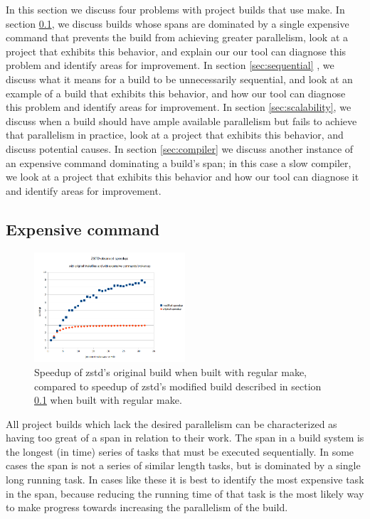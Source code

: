 \documentclass[sigconf,10pt,authorversion]{acmart}\settopmatter{printfolios=true,printccs=false,printacmref=false}
\begin{document}
In this section we discuss four problems with project builds that use make.  In section \ref{sec:expensive},
we discuss
builds whose spans are dominated by a single expensive command that prevents the build from
achieving greater parallelism, look at a project that exhibits this behavior, and explain our
our tool can diagnose this problem and identify areas for improvement.  In section \ref{sec:sequential}
, we discuss what
it means for a build to be unnecessarily sequential, and look at an example of a build that
exhibits this behavior, and how our tool can diagnose this problem and identify areas for improvement.
In section \ref{sec:scalability}, we discuss when a build should have ample available parallelism
but fails to achieve that
parallelism in practice, look at a project that exhibits this behavior, and discuss potential causes.
In section \ref{sec:compiler} we discuss another instance of an expensive command dominating a
build's span; in this case a
slow compiler, we look at a project that exhibits this behavior and how our tool can diagnose it
and identify areas for improvement.

\subsection{Expensive command}
\label{sec:expensive}

\begin{figure}[t]
  \includegraphics[width=0.5\textwidth]{zstd-speedup}
  \caption{Speedup of zstd's original build when built with regular make,
    compared to speedup of zstd's modified build described in section \ref{sec:expensive}
  when built with regular make.}
  \label{fig:zstd}
\end{figure}

All project builds which lack the desired parallelism can be characterized as having too great of
a span in relation to their work.  The span in a build system is the longest (in time) series of
tasks that must be executed sequentially.  In some cases the span is not a series of similar length
tasks, but is dominated by a single long running task.  In cases like these it is best to identify
the most expensive task in the span, because reducing the running time of that task is the
most likely way to make progress towards increasing the parallelism of the build.
\end{document}
